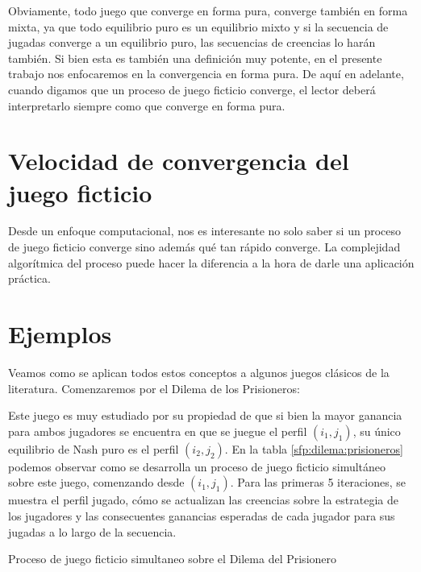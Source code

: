 Obviamente, todo juego que converge en forma pura, converge también en forma mixta, ya que todo equilibrio puro es un equilibrio mixto y si la secuencia de jugadas converge a un equilibrio puro, las secuencias de creencias lo harán también.
Si bien esta es también una definición muy potente, en el presente trabajo nos enfocaremos en la convergencia en forma pura. De aquí en adelante, cuando digamos que un proceso de juego ficticio converge, el lector deberá interpretarlo siempre como que converge en forma pura.

\section{Velocidad de convergencia del juego ficticio}

Desde un enfoque computacional, nos es interesante no solo saber si un proceso de juego ficticio converge sino además qué tan rápido converge. La complejidad algorítmica del proceso puede hacer la diferencia a la hora de darle una aplicación práctica.




\section{Ejemplos}

Veamos como se aplican todos estos conceptos a algunos juegos clásicos de la literatura. Comenzaremos por el Dilema de los Prisioneros:




Este juego es muy estudiado por su propiedad de que si bien la mayor ganancia para ambos jugadores se encuentra en que se juegue el perfil $(i_1, j_1)$, su único equilibrio de Nash puro es el perfil $(i_2, j_2)$. En la tabla \ref{sfp:dilema:prisioneros} podemos observar como se desarrolla un proceso de juego ficticio simultáneo sobre este juego, comenzando desde $(i_1, j_1)$. Para las primeras 5 iteraciones, se muestra el perfil jugado, cómo se actualizan las creencias sobre la estrategia de los jugadores y las consecuentes ganancias esperadas de cada jugador para sus jugadas a lo largo de la secuencia.

\begin{table} %
    \centering
    
    \caption{Proceso de juego ficticio simultaneo sobre el Dilema del Prisionero}
    \label{sfp:dilema:prisioneros}
\end{table}

